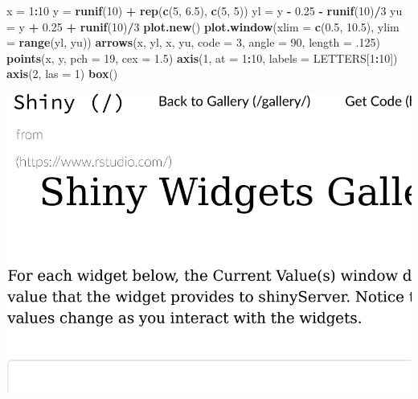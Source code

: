\documentclass[]{book}
\newenvironment{Shaded}{\begin{snugshade}}{\end{snugshade}}
\newcommand{\DataTypeTok}[1]{\textcolor[rgb]{0.13,0.29,0.53}{#1}}
\newcommand{\DecValTok}[1]{\textcolor[rgb]{0.00,0.00,0.81}{#1}}
\newcommand{\FloatTok}[1]{\textcolor[rgb]{0.00,0.00,0.81}{#1}}
\newcommand{\KeywordTok}[1]{\textcolor[rgb]{0.13,0.29,0.53}{\textbf{#1}}}
\newcommand{\NormalTok}[1]{#1}
\newcommand{\OperatorTok}[1]{\textcolor[rgb]{0.81,0.36,0.00}{\textbf{#1}}}
\newcommand{\StringTok}[1]{\textcolor[rgb]{0.31,0.60,0.02}{#1}}
\theoremstyle{definition}
\theoremstyle{definition}
\theoremstyle{definition}
\theoremstyle{remark}
\begin{document}
\begin{Shaded}
\begin{Highlighting}[]
\NormalTok{x =}\StringTok{ }\DecValTok{1}\OperatorTok{:}\DecValTok{10}
\NormalTok{y =}\StringTok{ }\KeywordTok{runif}\NormalTok{(}\DecValTok{10}\NormalTok{) }\OperatorTok{+}\StringTok{ }\KeywordTok{rep}\NormalTok{(}\KeywordTok{c}\NormalTok{(}\DecValTok{5}\NormalTok{, }\FloatTok{6.5}\NormalTok{), }\KeywordTok{c}\NormalTok{(}\DecValTok{5}\NormalTok{, }\DecValTok{5}\NormalTok{))}
\NormalTok{yl =}\StringTok{ }\NormalTok{y }\OperatorTok{-}\StringTok{ }\FloatTok{0.25} \OperatorTok{-}\StringTok{ }\KeywordTok{runif}\NormalTok{(}\DecValTok{10}\NormalTok{)}\OperatorTok{/}\DecValTok{3}
\NormalTok{yu =}\StringTok{ }\NormalTok{y }\OperatorTok{+}\StringTok{ }\FloatTok{0.25} \OperatorTok{+}\StringTok{ }\KeywordTok{runif}\NormalTok{(}\DecValTok{10}\NormalTok{)}\OperatorTok{/}\DecValTok{3}
\KeywordTok{plot.new}\NormalTok{()}
\KeywordTok{plot.window}\NormalTok{(}\DataTypeTok{xlim =} \KeywordTok{c}\NormalTok{(}\FloatTok{0.5}\NormalTok{, }\FloatTok{10.5}\NormalTok{), }\DataTypeTok{ylim =} \KeywordTok{range}\NormalTok{(yl, yu))}
\KeywordTok{arrows}\NormalTok{(x, yl, x, yu, }\DataTypeTok{code =} \DecValTok{3}\NormalTok{, }\DataTypeTok{angle =} \DecValTok{90}\NormalTok{, }\DataTypeTok{length =} \FloatTok{.125}\NormalTok{)}
\KeywordTok{points}\NormalTok{(x, y, }\DataTypeTok{pch =} \DecValTok{19}\NormalTok{, }\DataTypeTok{cex =} \FloatTok{1.5}\NormalTok{)}
\KeywordTok{axis}\NormalTok{(}\DecValTok{1}\NormalTok{, }\DataTypeTok{at =} \DecValTok{1}\OperatorTok{:}\DecValTok{10}\NormalTok{, }\DataTypeTok{labels =}\NormalTok{ LETTERS[}\DecValTok{1}\OperatorTok{:}\DecValTok{10}\NormalTok{])}
\KeywordTok{axis}\NormalTok{(}\DecValTok{2}\NormalTok{, }\DataTypeTok{las =} \DecValTok{1}\NormalTok{)}
\KeywordTok{box}\NormalTok{()}
\end{Highlighting}
\end{Shaded}

\includegraphics[width=0.5\linewidth]{Rcourse_files/figure-latex/unnamed-chunk-268-1}
\end{document}
